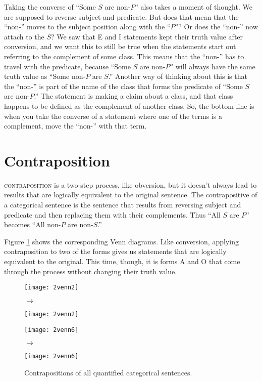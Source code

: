 Taking the converse of ``Some $S$ are non-$P$'' also takes a moment of thought. We are supposed to reverse subject and predicate. But does that mean that the ``non-'' moves to the subject position along with the ``$P$''? Or does the ``non-'' now attach to the $S$? We saw that E and I statements kept their truth value after conversion, and we want this to still be true when the statements start out referring to the complement of some class. This means that the ``non-'' has to travel with the predicate, because ``Some $S$ are non-$P$'' will always have the same truth value as ``Some non-$P$ are $S$.'' Another way of thinking about this is that the ``non-'' is part of the name of the class that forms the predicate of ``Some $S$ are non-$P$.'' The statement is making a claim about a class, and that class happens to be defined as the complement of another class. So, the bottom line is when you take the converse of a statement where one of the terms is a complement, move the ``non-'' with that term.

\section{Contraposition}\label{sec:contraposition}

\textsc{\Gls{contraposition}} is a two-step process, like obversion, but it doesn't always lead to results that are logically equivalent to the original sentence. The contrapositive of a categorical sentence is the sentence that results from reversing subject and predicate and then replacing them with their complements. Thus ``All $S$ are $P$'' becomes ``All non-$P$ are non-$S$.''

Figure \ref{fig:contraposition} shows the corresponding Venn diagrams. Like conversion, applying contraposition to two of the forms gives us statements that are logically equivalent to the original. This time, though, it is forms A and O that come through the process without changing their truth value.


\begin{figure}[!ht]
\texttt{[image: 2venn2]}
\begin{minipage}[c]{0.1\textwidth}\vspace{-2.5cm}\hspace{.4cm}$\to$\end{minipage}
\texttt{[image: 2venn2]}

\texttt{[image: 2venn6]}
\begin{minipage}[c]{0.1\textwidth}\vspace{-2.5cm}\hspace{.4cm}$\to$\end{minipage}
\texttt{[image: 2venn6]}
\caption{Contrapositions of all quantified categorical sentences.}
\label{fig:contraposition}
\end{figure}


